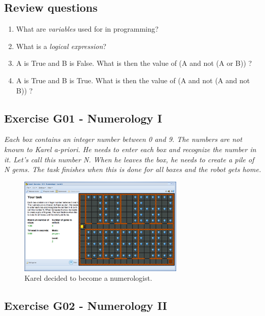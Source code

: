 \documentclass[article,A4,12pt]{llncs}
\begin{document}
{{{{\subsection{Review questions}

\begin{enumerate}
\item What are {\em variables} used for in programming? 
\item What is a {\em logical expression}? 
\item A is True and B is False. What is then the value of (A and not (A or B)) ?
\item A is True and B is True. What is then the value of (A and not (A and not B)) ?
\end{enumerate}

\subsection{Exercise G01 - Numerology I}

{\em Each box contains an integer number between 0 and 9. The numbers are not known to Karel a-priori. He needs to enter each box and recognize the number in it. Let's call this number N. When he leaves the box, he needs to create a pile of N gems. The task finishes when this is done for all boxes and the robot gets home.}

\begin{figure}[!ht]
\begin{center}
\includegraphics[width=0.7\textwidth]{img/g10.png}
\end{center}
\vspace{-4mm}
\caption{Karel decided to become a numerologist.}
\label{fig:g10}
\vspace{-4mm}
\end{figure}
\noindent

\subsection{Exercise G02 - Numerology II}

}}}}
\end{document}
